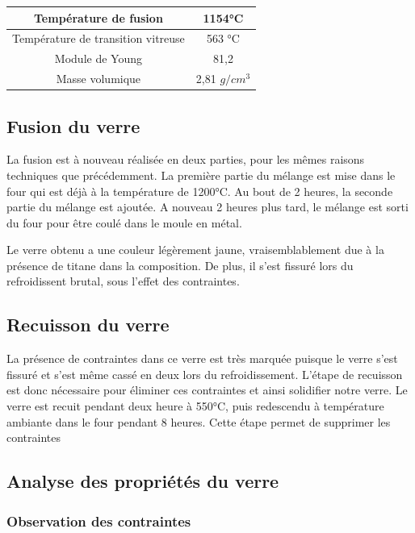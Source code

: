 \documentclass{article}
\begin{document}
\begin{table}[ht]
    \centering
\begin{tabular}{|c|c|}
    \hline
    Température de fusion & 1154°C \\
    \hline
    Température de transition vitreuse & 563 °C \\
    \hline
    Module de Young & 81,2 \\
    \hline
    Masse volumique & 2,81 $g/cm^{3}$ \\
    \hline
    \end{tabular} 
\end{table}

\subsection{Fusion du verre}

La fusion est à nouveau réalisée en deux parties, pour les mêmes raisons techniques que précédemment.
La première partie du mélange est mise dans le four qui est déjà à la température de 1200°C. Au bout de 2 heures, la seconde partie du mélange est ajoutée. A nouveau 2 heures plus tard, le mélange est sorti du four pour être coulé dans le moule en métal.

Le verre obtenu a une couleur légèrement jaune, vraisemblablement due à la présence de titane dans la composition. De plus, il s'est fissuré lors du refroidissent brutal, sous l'effet des contraintes.
\subsection{Recuisson du verre }

La présence de contraintes dans ce verre est très marquée puisque le verre s'est fissuré et s'est même cassé en deux lors du refroidissement. L'étape de recuisson est donc nécessaire pour éliminer ces contraintes et ainsi solidifier notre verre.
Le verre est recuit pendant deux heure à 550°C, puis redescendu à température ambiante dans le four pendant 8 heures. Cette étape permet de supprimer les contraintes

\subsection{Analyse des propriétés du verre}

\subsubsection{Observation des contraintes}
\end{document}

